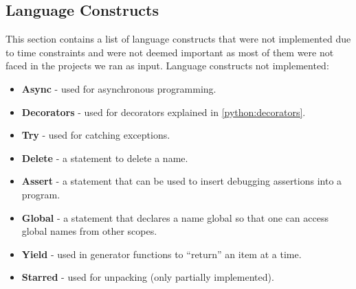 \subsection{Language Constructs}
This section contains a list of language constructs that were not implemented due to time constraints and were not deemed important as most of them were not faced in the projects we ran as input.
Language constructs not implemented:
\begin{itemize}
\item \textbf{Async} - used for asynchronous programming.\cite{python_async}
\item \textbf{Decorators} - used for decorators explained in \cref{python:decorators}.
\item \textbf{Try} - used for catching exceptions.\cite{python_exception}
\item \textbf{Delete} - a statement to delete a name.\cite{python_delete}
\item \textbf{Assert} - a statement that can be used to insert debugging assertions into a program.\cite{python_assert}
\item \textbf{Global} - a statement that declares a name global so that one can access global names from other scopes.\cite{python_global}
\item \textbf{Yield} - used in generator functions to ``return'' an item at a time.\cite{python_yield}
\item \textbf{Starred} - used for unpacking (only partially implemented).\cite{python_unpacking}
\end{itemize}

